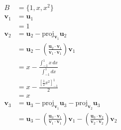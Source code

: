 \documentclass{article}
\begin{document}
\begin{align*}
  B            & = \{1, x, x^2\}                                                                                                                                                                                                            \\
  \mathbf{v}_1 & = \mathbf{u}_1                                                                                                                                                                                                             \\
               & = 1                                                                                                                                                                                                                        \\
  \mathbf{v}_2 & = \mathbf{u}_2 - \text{proj}_{\mathbf{v}_1} \mathbf{u}_2                                                                                                                                                                   \\
               & = \mathbf{u}_2 - \left( \frac{\mathbf{u}_2 \cdot \mathbf{v}_1}{\mathbf{v}_1 \cdot \mathbf{v}_1} \right) \mathbf{v}_1                                                                                                       \\
               & = x - \frac{\int_{-1}^1 x \,dx}{\int_{-1}^1 dx}                                                                                                                                                                            \\
               & = x - \frac{\left[ \frac{1}{2} x^2 \right]_{-1}^1}{2}                                                                                                                                                                      \\
               & = x                                                                                                                                                                                                                        \\
  \mathbf{v}_3 & = \mathbf{u}_3 - \text{proj}_{\mathbf{v}_1} \mathbf{u}_3 - \text{proj}_{\mathbf{v}_2} \mathbf{u}_3                                                                                                                         \\
               & = \mathbf{u}_3 - \left( \frac{\mathbf{u}_3 \cdot \mathbf{v}_1}{\mathbf{v}_1 \cdot \mathbf{v}_1} \right) \mathbf{v}_1 - \left( \frac{\mathbf{u}_3 \cdot \mathbf{v}_2}{\mathbf{v}_2 \cdot \mathbf{v}_2} \right) \mathbf{v}_2 \\

\end{align*}
\end{document}

